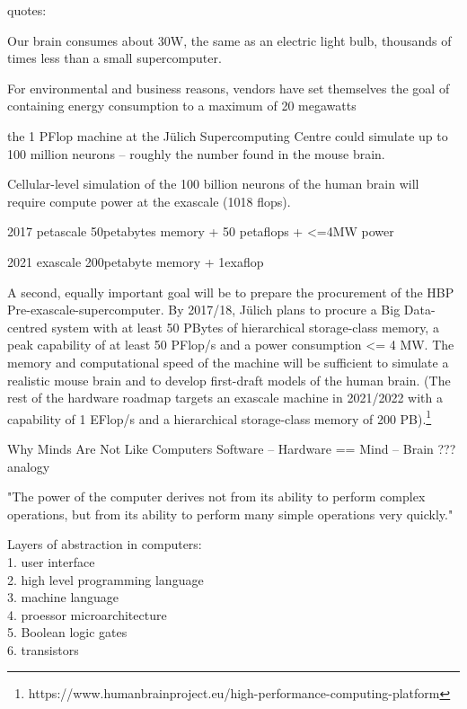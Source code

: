 \begin{draft}
quotes:

Our brain consumes about 30W, the same as an electric light bulb, thousands of times less than a small supercomputer. \autocite[p.17]{Walker2012}

For environmental and business reasons, vendors have set themselves the goal of containing energy consumption to a maximum of 20 megawatts  \autocite[p.41]{Walker2012}

the 1 PFlop machine at the Jülich Supercomputing Centre could simulate up to 100 million neurons – roughly the number found in the mouse brain. \autocite[p.41]{Walker2012}

Cellular-level simulation of the 100 billion neurons of the human brain will require compute power at the exascale (1018 flops). \autocite[p.41-42]{Walker2012}

2017 petascale 50petabytes memory + 50 petaflops + <=4MW power

2021 exascale 200petabyte memory + 1exaflop

A second, equally important goal will be to prepare the procurement of the HBP Pre-exascale-supercomputer. By 2017/18, Jülich plans to procure a Big Data-centred system with at least 50 PBytes of hierarchical storage-class memory, a peak capability of at least 50 PFlop/s and a power consumption <= 4 MW. The memory and computational speed of the machine will be sufficient to simulate a realistic mouse brain and to develop first-draft models of the human brain. (The rest of the hardware roadmap targets an exascale machine in 2021/2022 with a capability of 1 EFlop/s and a hierarchical storage-class memory of 200 PB).\footnote{https://www.humanbrainproject.eu/high-performance-computing-platform}

\end{draft}

Why Minds Are Not Like Computers \autocite{Schulman2009}
Software – Hardware == Mind – Brain ??? analogy

"The power of the computer derives not from its ability to perform complex operations, but from its ability to perform many simple operations very quickly."

Layers of abstraction in computers:\\
1.	user interface\\
2.	high level programming language\\
3.	machine language\\
4.	proessor microarchitecture\\
5.	Boolean logic gates\\
6.	transistors\\

